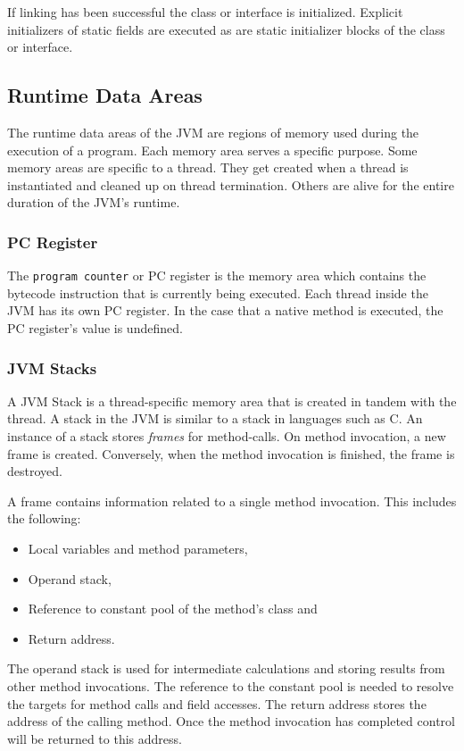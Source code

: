 If linking has been successful the class or interface is initialized. Explicit initializers of static fields are executed as are static initializer blocks of the class or interface.

\subsection{Runtime Data Areas}

The runtime data areas of the JVM are regions of memory used during the execution of a program. Each memory area serves a specific purpose. Some memory areas are specific to a thread. They get created when a thread is instantiated and cleaned up on thread termination. Others are alive for the entire duration of the JVM's runtime.  

\subsubsection{PC Register}

The \texttt{program counter} or PC register is the memory area which contains the bytecode instruction that is currently being executed. Each thread inside the JVM has its own PC register. In the case that a native method is executed, the PC register's value is undefined.

\subsubsection{JVM Stacks}

A JVM Stack is a thread-specific memory area that is created in tandem with the thread. A stack in the JVM is similar to a stack in languages such as C. An instance of a stack stores \textit{frames} for method-calls. On method invocation, a new frame is created. Conversely, when the method invocation is finished, the frame is destroyed. 

A frame contains information related to a single method invocation. This includes the following:

\begin{itemize}
    \item Local variables and method parameters,
    \item Operand stack,
    \item Reference to constant pool of the method's class and
    \item Return address.
\end{itemize}

The operand stack is used for intermediate calculations and storing results from other method invocations. The reference to the constant pool is needed to resolve the targets for method calls and field accesses. The return address stores the address of the calling method. Once the method invocation has completed control will be returned to this address.

